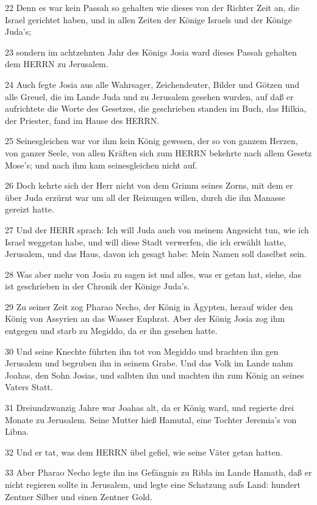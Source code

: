 \par 22 Denn es war kein Passah so gehalten wie dieses von der Richter Zeit an, die Israel gerichtet haben, und in allen Zeiten der Könige Israels und der Könige Juda's;
\par 23 sondern im achtzehnten Jahr des Königs Josia ward dieses Passah gehalten dem HERRN zu Jerusalem.
\par 24 Auch fegte Josia aus alle Wahrsager, Zeichendeuter, Bilder und Götzen und alle Greuel, die im Lande Juda und zu Jerusalem gesehen wurden, auf daß er aufrichtete die Worte des Gesetzes, die geschrieben standen im Buch, das Hilkia, der Priester, fand im Hause des HERRN.
\par 25 Seinesgleichen war vor ihm kein König gewesen, der so von ganzem Herzen, von ganzer Seele, von allen Kräften sich zum HERRN bekehrte nach allem Gesetz Mose's; und nach ihm kam seinesgleichen nicht auf.
\par 26 Doch kehrte sich der Herr nicht von dem Grimm seines Zorns, mit dem er über Juda erzürnt war um all der Reizungen willen, durch die ihn Manasse gereizt hatte.
\par 27 Und der HERR sprach: Ich will Juda auch von meinem Angesicht tun, wie ich Israel weggetan habe, und will diese Stadt verwerfen, die ich erwählt hatte, Jerusalem, und das Haus, davon ich gesagt habe: Mein Namen soll daselbst sein.
\par 28 Was aber mehr von Josia zu sagen ist und alles, was er getan hat, siehe, das ist geschrieben in der Chronik der Könige Juda's.
\par 29 Zu seiner Zeit zog Pharao Necho, der König in Ägypten, herauf wider den König von Assyrien an das Wasser Euphrat. Aber der König Josia zog ihm entgegen und starb zu Megiddo, da er ihn gesehen hatte.
\par 30 Und seine Knechte führten ihn tot von Megiddo und brachten ihn gen Jerusalem und begruben ihn in seinem Grabe. Und das Volk im Lande nahm Joahas, den Sohn Josias, und salbten ihn und machten ihn zum König an seines Vaters Statt.
\par 31 Dreiundzwanzig Jahre war Joahas alt, da er König ward, und regierte drei Monate zu Jerusalem. Seine Mutter hieß Hamutal, eine Tochter Jeremia's von Libna.
\par 32 Und er tat, was dem HERRN übel gefiel, wie seine Väter getan hatten.
\par 33 Aber Pharao Necho legte ihn ins Gefängnis zu Ribla im Lande Hamath, daß er nicht regieren sollte in Jerusalem, und legte eine Schatzung aufs Land: hundert Zentner Silber und einen Zentner Gold.
